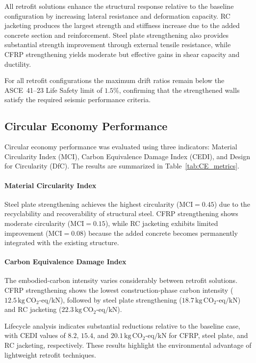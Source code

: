 \documentclass[fleqn,10pt]{wlscirep}
\begin{document}
All retrofit solutions enhance the structural response relative to the
baseline configuration by increasing lateral resistance and deformation
capacity. RC jacketing produces the largest strength and stiffness increase
due to the added concrete section and reinforcement. Steel plate
strengthening also provides substantial strength improvement through
external tensile resistance, while CFRP strengthening yields moderate but
effective gains in shear capacity and ductility.

For all retrofit configurations the maximum drift ratios remain below the
ASCE~41--23 Life Safety limit of $1.5\%$, confirming that the strengthened
walls satisfy the required seismic performance criteria.

\subsection{Circular Economy Performance}

Circular economy performance was evaluated using three indicators:
Material Circularity Index (MCI), Carbon Equivalence Damage Index (CEDI),
and Design for Circularity (DfC). The results are summarized in
Table~\ref{tab:CE_metrics}.

\paragraph{Material Circularity Index}

Steel plate strengthening achieves the highest circularity
($\mathrm{MCI}=0.45$) due to the recyclability and recoverability of
structural steel. CFRP strengthening shows moderate circularity
($\mathrm{MCI}=0.15$), while RC jacketing exhibits limited improvement
($\mathrm{MCI}=0.08$) because the added concrete becomes permanently
integrated with the existing structure.

\paragraph{Carbon Equivalence Damage Index}

The embodied-carbon intensity varies considerably between retrofit
solutions. CFRP strengthening shows the lowest construction-phase carbon
intensity ($12.5\,\mathrm{kg\,CO_2\text{-}eq/kN}$), followed by steel plate
strengthening ($18.7\,\mathrm{kg\,CO_2\text{-}eq/kN}$) and RC jacketing
($22.3\,\mathrm{kg\,CO_2\text{-}eq/kN}$).

Lifecycle analysis indicates substantial reductions relative to the
baseline case, with CEDI values of
$8.2$, $15.4$, and $20.1\,\mathrm{kg\,CO_2\text{-}eq/kN}$ for CFRP,
steel plate, and RC jacketing, respectively. These results highlight the
environmental advantage of lightweight retrofit techniques.
\end{document}
